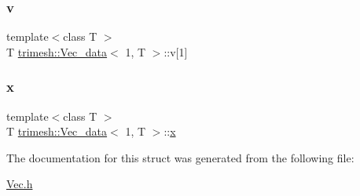 \subsubsection{\texorpdfstring{v}{v}}
{\footnotesize\ttfamily template$<$class T $>$ \\
T \hyperlink{structtrimesh_1_1Vec__data}{trimesh\+::\+Vec\+\_\+data}$<$ 1, T $>$\+::v\mbox{[}1\mbox{]}}

\mbox{\label{structtrimesh_1_1Vec__data_3_011_00_01T_01_4_a3adca5743364447d65d3392ca7de30b9}} 
\subsubsection{\texorpdfstring{x}{x}}
{\footnotesize\ttfamily template$<$class T $>$ \\
T \hyperlink{structtrimesh_1_1Vec__data}{trimesh\+::\+Vec\+\_\+data}$<$ 1, T $>$\+::\hyperlink{namespacetrimesh_a3365d1b1a1bc5d8e9c844cf589a8c4a8}{x}}



The documentation for this struct was generated from the following file\+:\begin{DoxyCompactItemize}
\item 
\hyperlink{Vec_8h}{Vec.\+h}\end{DoxyCompactItemize}
